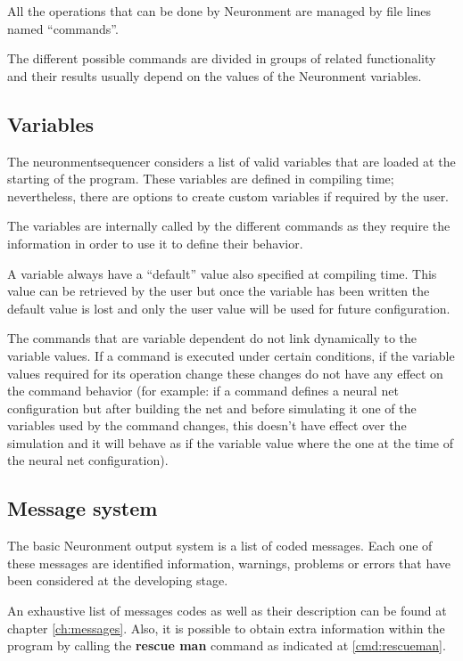All the operations that can be done by Neuronment are managed by \NPROC file lines named ``commands''.

The different possible commands are divided in groups of related functionality and their results usually depend on the values of the Neuronment variables.

\subsection{Variables}

The \gls{neuronmentsequencer} considers a list of valid variables that are loaded at the starting of the program. These variables are defined in compiling time; nevertheless, there are options to create custom variables if required by the user. \lotharpi

The variables are internally called by the different commands as they require the information in order to use it to define their behavior.

A variable always have a ``default'' value also specified at compiling time. This value can be retrieved by the user but once the variable has been written the default value is lost and only the user value will be used for future configuration.

The commands that are variable dependent do not link dynamically to the variable values. If a command is executed under certain conditions, if the variable values required for its operation change these changes do not have any effect on the command behavior (for example: if a command defines a neural net configuration but after building the net and before simulating it one of the variables used by the command changes, this doesn't have effect over the simulation and it will behave as if the variable value where the one at the time of the neural net configuration).

\subsection{Message system}

The basic Neuronment output system is a list of coded messages. Each one of these messages are identified information, warnings, problems or errors that have been considered at the developing stage.

An exhaustive list of messages codes as well as their description can be found at chapter \ref{ch:messages}. Also, it is possible to obtain extra information within the program by calling the \textbf{rescue man} command as indicated at \ref{cmd:rescueman}. \lotharpi

